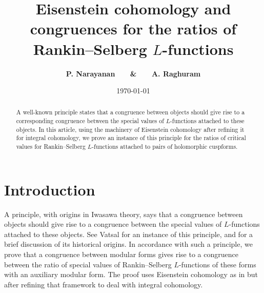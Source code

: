 \documentclass[11pt]{amsart}
\title[Eisenstein cohomology and congruences]{Eisenstein cohomology and congruences for the ratios of Rankin--Selberg $L$-functions}
\author{\bf P. Narayanan \ \ \ \& \ \ \ A. Raghuram}
\date{\today}
\begin{document}
	
	
\begin{abstract} 
A well-known principle states that a congruence between objects should give rise to a corresponding congruence between the 
special values of $L$-functions attached to these 
objects. In this article, using the machinery of Eisenstein cohomology after refining it for integral cohomology, we prove an instance of 
this principle for the ratios of critical values for Rankin--Selberg $L$-functions attached to pairs of holomorphic cuspforms. 
\end{abstract}


\maketitle


\tableofcontents 



\section{Introduction}
A principle, with origins in Iwasawa theory, says that a congruence between objects should give rise to a congruence between 
the special values of $L$-functions attached to these objects. 
See Vatsal \cite{vatsal} for an instance of this principle, and for a brief discussion of its historical origins.
In accordance with such a principle, we prove that a congruence 
between modular forms gives rise to a congruence between the ratio of special values of Rankin--Selberg $L$-functions of these forms with an auxiliary modular form. 
 The proof uses Eisenstein cohomology as in \cite{harder-raghuram} but after refining that framework to deal with integral cohomology.


\smallskip
\end{document}
